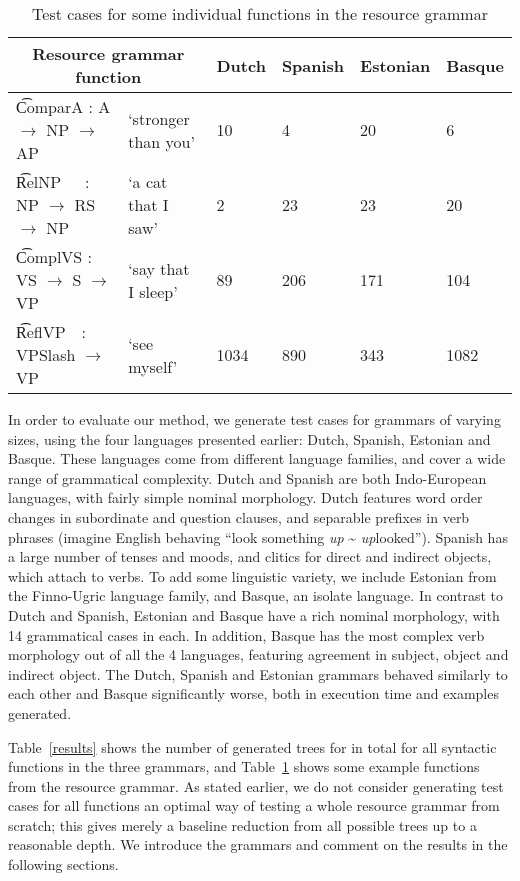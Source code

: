 \begin{table}[h]

\centering
\begin{tabular}{|ll|l|l|l|l|}
\hline
\multicolumn{2}{|c|}{\bf Resource grammar function} & {\bf Dutch} & {\bf Spanish}
   & {\bf Estonian} & {\bf Basque} \\ \hline
 
\t{ComparA : A  $\rightarrow$ NP $\rightarrow$ AP~} & `stronger than you' & 10   & 4   & 20 & 6   \\
\t{RelNP~~~: NP $\rightarrow$ RS $\rightarrow$ NP~} & `a cat that I saw'  & 2    & 23 & 23 & 20   \\
\t{ComplVS : VS $\rightarrow$ S  $\rightarrow$ VP~} &`say that I sleep'  & 89   & 206 & 171 & 104 \\
\t{ReflVP~~: VPSlash $\rightarrow$ VP~~} & `see myself'        & 1034 & 890 & 343 & 1082 \\
\hline
\end{tabular}
\caption{Test cases for some individual functions in the resource
  grammar}
\label{results_indiv}
\end{table}

In order to evaluate our method, we generate test cases for grammars
of varying sizes, using the four languages presented earlier: Dutch, Spanish,
Estonian and Basque. These languages come from different language
families, and cover a wide range of grammatical complexity. Dutch and
Spanish are both Indo-European languages, with fairly simple nominal
morphology. Dutch features word order changes in subordinate and
question clauses, and separable prefixes in verb phrases (imagine
English behaving ``look something \emph{up} \~{} {\it up}looked''). 
Spanish has a large number of tenses and moods, and clitics for direct
and indirect objects, which attach to verbs.  To add some linguistic
variety, we include Estonian from the Finno-Ugric language family, and
Basque, an isolate language.  In contrast to Dutch and Spanish,
Estonian and Basque have a rich nominal morphology, with 14
grammatical cases in each. In addition, Basque has the most complex
verb morphology out of all the 4 languages, featuring agreement in
subject, object and indirect object.
The Dutch, Spanish and Estonian grammars behaved similarly to each other
and Basque significantly worse, both in execution time and examples
generated.

Table~\ref{results} shows the number of generated trees for 
in total for all syntactic functions in the three grammars, and
Table~\ref{results_indiv} shows some example functions from the resource grammar. 
As stated earlier, we do not consider generating test cases for all
functions an optimal way of testing a whole resource grammar from scratch;
this gives merely a baseline reduction from all possible trees up to a
reasonable depth. We introduce the grammars and comment on the results
in the following sections. 

